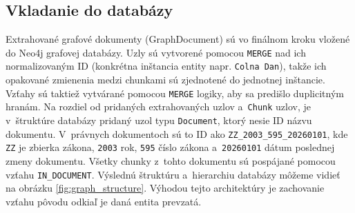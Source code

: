 \subsection{Vkladanie do databázy}
Extrahované grafové dokumenty (GraphDocument) sú vo finálnom kroku vložené do Neo4j grafovej databázy. Uzly sú vytvorené pomocou \texttt{MERGE} nad ich normalizovaným ID (konkrétna inštancia entity napr. \texttt{Colna Dan}), takže ich opakované zmienenia medzi chunkami sú zjednotené do jednotnej inštancie. Vzťahy sú taktiež vytvárané pomocou \texttt{MERGE} logiky, aby sa predišlo duplicitným hranám. Na rozdiel od pridaných extrahovaných uzlov a~\texttt{Chunk} uzlov, je v~štruktúre databázy pridaný uzol typu \texttt{Document}, ktorý nesie ID názvu dokumentu. V~právnych dokumentoch sú to ID ako \texttt{ZZ\_2003\_595\_20260101}, kde \texttt{ZZ} je zbierka zákona, \texttt{2003} rok, \texttt{595} číslo zákona a~\texttt{20260101} dátum poslednej zmeny dokumentu. Všetky chunky z~tohto dokumentu sú pospájané pomocou vzťahu \texttt{IN\_DOCUMENT}. Výslednú štruktúru a~hierarchiu databázy môžeme vidieť na obrázku \ref{fig:graph_structure}. Výhodou tejto architektúry je zachovanie vzťahu pôvodu odkiaľ je daná entita prevzatá.

